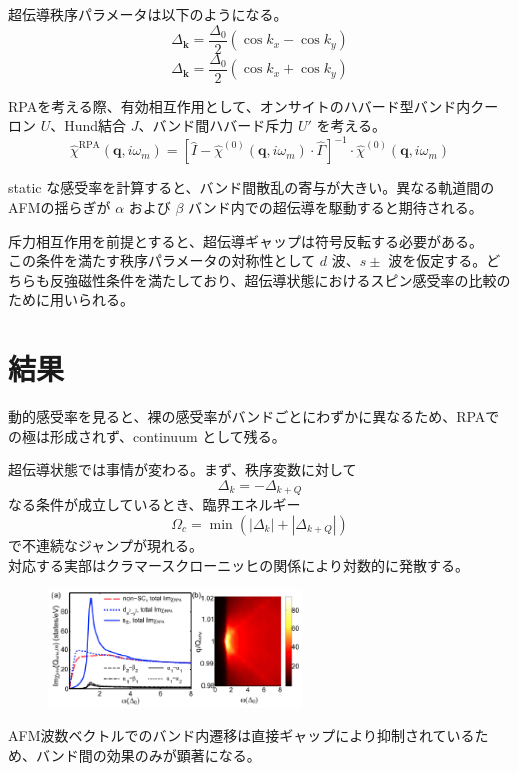 \documentclass[a4paper,12pt]{article}
\begin{document}
\begin{CJK}{UTF8}{min}
超伝導秩序パラメータは以下のようになる。
\[
\Delta_{\mathbf{k}} = \frac{\Delta_0}{2} \left( \cos k_x - \cos k_y \right)
\]
\[
\Delta_{\mathbf{k}} = \frac{\Delta_0}{2} \left( \cos k_x + \cos k_y \right)
\]

RPAを考える際、有効相互作用として、オンサイトのハバード型バンド内クーロン \( U \)、Hund結合 \( J \)、バンド間ハバード斥力 \( U' \) を考える。
\[
\hat{\chi}^{\mathrm{RPA}}(\mathbf{q}, i\omega_m) = 
\left[ \hat{I} - \hat{\chi}^{(0)}(\mathbf{q}, i\omega_m) \cdot \hat{\Gamma} \right]^{-1}
\cdot \hat{\chi}^{(0)}(\mathbf{q}, i\omega_m)
\]

static な感受率を計算すると、バンド間散乱の寄与が大きい。異なる軌道間のAFMの揺らぎが \(\alpha\) および \(\beta\) バンド内での超伝導を駆動すると期待される。

斥力相互作用を前提とすると、超伝導ギャップは符号反転する必要がある。\\
この条件を満たす秩序パラメータの対称性として \( d \) 波、\( s\pm \) 波を仮定する。どちらも反強磁性条件を満たしており、超伝導状態におけるスピン感受率の比較のために用いられる。

\section*{結果}
動的感受率を見ると、裸の感受率がバンドごとにわずかに異なるため、RPAでの極は形成されず、continuum として残る。

超伝導状態では事情が変わる。まず、秩序変数に対して
\[
\Delta_k = -\Delta_{k+Q}
\]
なる条件が成立しているとき、臨界エネルギー
\[
\Omega_c = \min\left(|\Delta_k| + |\Delta_{k+Q}|\right)
\]
で不連続なジャンプが現れる。\\
対応する実部はクラマースクローニッヒの関係により対数的に発散する。

\begin{figure}[h]
    \centering
    \includegraphics[width=0.6\textwidth]{image-16.eps}
    \caption*{}
\end{figure}

AFM波数ベクトルでのバンド内遷移は直接ギャップにより抑制されているため、バンド間の効果のみが顕著になる。\\


\end{CJK}
\end{document}
